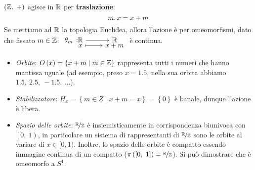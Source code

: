 \begin{example}
	$\left(\mathbb{Z},\ +\right)$ agisce in $\mathbb{R}$ per \textbf{traslazione}:
	\begin{equation}
		m\ldotp x = x+m
	\end{equation}
Se mettiamo ad $\mathbb{R}$ la topologia Euclidea, allora l'azione è per omeomorfismi, dato che fissato $m\in \mathbb{Z}$: $\funztot{\theta_m}{\realset}{\realset}{x}{x+m}$ è continua.
\begin{itemize}
	\item \textit{Orbite}: $O\left(x\right)=\left\{x+m\mid m\in \mathbb{Z}\right\}$ rappresenta tutti i numeri che hanno mantissa uguale (ad esempio, preso $x=1.5$, nella sua orbita abbiamo $1.5,\ 2.5,\ -1.5,\ \ldots$).
	\item \textit{Stabilizzatore}: $H_x=\left\{m\in Z\mid x+m=x\right\}=\left\{0\right\}$ è banale, dunque l'azione è libera.
	\item \textit{Spazio delle orbite}: $\nicefrac{\mathbb{R}}{\mathbb{Z}}$ è insiemisticamente in corrispondenza biunivoca con $\left[0,\ 1\right)$, in particolare un sistema di rappresentanti di $\nicefrac{\mathbb{R}}{\mathbb{Z}}$ sono le orbite al variare di $x\in[0,1)$. Inoltre, lo spazio delle orbite è compatto essendo immagine continua di un compatto ($\pi\left(\left[0,\ 1\right]\right)=\nicefrac{\realset}{\integerset}$). Si può dimostrare che è omeomorfo a $S^1$.
\end{itemize}
\vspace{-3mm}
\end{example}

